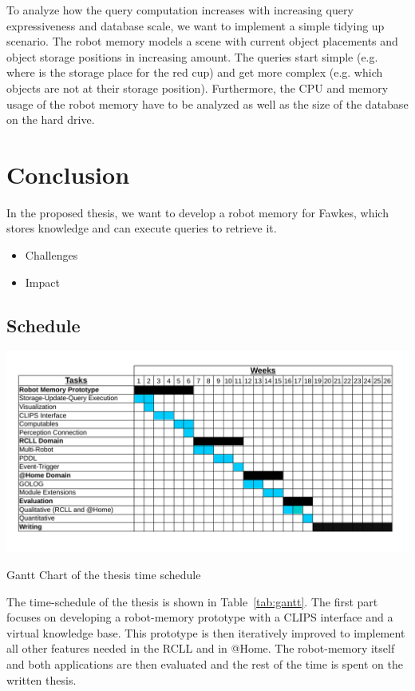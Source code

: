 \documentclass[a4paper,11pt]{article}
\newcommand{\reftab}[1]{Table~\ref{#1}}
\begin{document}
To analyze how the query computation increases with increasing query
expressiveness and database scale, we want to implement a simple
tidying up scenario. The robot memory models a scene with current
object placements and object storage positions in increasing
amount. The queries start simple (e.g. where is the storage place for
the red cup) and get more complex (e.g. which objects are not at their
storage position). Furthermore, the CPU and memory usage of the robot
memory have to be analyzed as well as the size of the database on the
hard drive.

\section{Conclusion}
\label{sec:conclusion}
In the proposed thesis, we want to develop a robot memory for Fawkes,
which stores knowledge and can execute queries to retrieve it.
\begin{itemize}
\item Challenges
\item Impact
\end{itemize}

\subsection{Schedule}
\begin{table}
  \centering
  \includegraphics[width=\textwidth]{gantt-chart}%
  \vspace{-5mm}
  \caption{Gantt Chart of the thesis time schedule}
  \label{tab:gantt}
\end{table}
The time-schedule of the thesis is shown in \reftab{tab:gantt}. The
first part focuses on developing a robot-memory prototype with a CLIPS
interface and a virtual knowledge base. This prototype is then
iteratively improved to implement all other features needed in the
RCLL and in @Home. The robot-memory itself and both applications are
then evaluated and the rest of the time is spent on the written
thesis.




\end{document}
